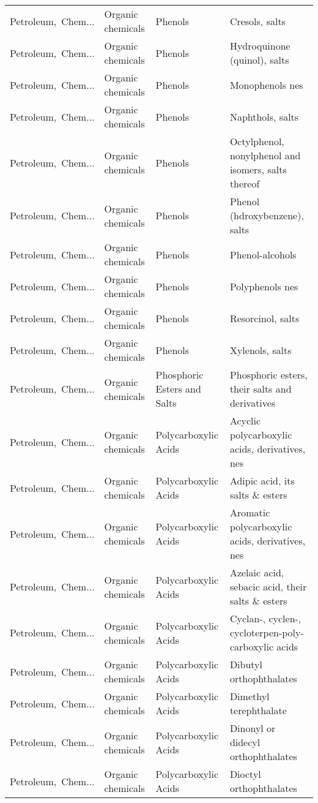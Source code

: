 \begin{appendices}
\begin{xltabular}{\textwidth}{|p{0.10\textwidth}|p{0.25\textwidth}|p{0.24\textwidth}|p{0.31\textwidth}|}
Petroleum,\ Chem... & Organic chemicals & Phenols & Cresols, salts \\
Petroleum,\ Chem... & Organic chemicals & Phenols & Hydroquinone (quinol), salts \\
Petroleum,\ Chem... & Organic chemicals & Phenols & Monophenols nes \\
Petroleum,\ Chem... & Organic chemicals & Phenols & Naphthols, salts \\
Petroleum,\ Chem... & Organic chemicals & Phenols & Octylphenol, nonylphenol and isomers, salts thereof \\
Petroleum,\ Chem... & Organic chemicals & Phenols & Phenol (hdroxybenzene), salts \\
Petroleum,\ Chem... & Organic chemicals & Phenols & Phenol-alcohols \\
Petroleum,\ Chem... & Organic chemicals & Phenols & Polyphenols nes \\
Petroleum,\ Chem... & Organic chemicals & Phenols & Resorcinol, salts \\
Petroleum,\ Chem... & Organic chemicals & Phenols & Xylenols, salts \\
Petroleum,\ Chem... & Organic chemicals & Phosphoric Esters and Salts & Phosphoric esters, their salts and derivatives \\
Petroleum,\ Chem... & Organic chemicals & Polycarboxylic Acids & Acyclic polycarboxylic acids, derivatives, nes \\
Petroleum,\ Chem... & Organic chemicals & Polycarboxylic Acids & Adipic acid, its salts \& esters \\
Petroleum,\ Chem... & Organic chemicals & Polycarboxylic Acids & Aromatic polycarboxylic acids, derivatives, nes \\
Petroleum,\ Chem... & Organic chemicals & Polycarboxylic Acids & Azelaic acid, sebacic acid, their salts \& esters \\
Petroleum,\ Chem... & Organic chemicals & Polycarboxylic Acids & Cyclan-, cyclen-, cycloterpen-poly-carboxylic acids \\
Petroleum,\ Chem... & Organic chemicals & Polycarboxylic Acids & Dibutyl orthophthalates \\
Petroleum,\ Chem... & Organic chemicals & Polycarboxylic Acids & Dimethyl terephthalate \\
Petroleum,\ Chem... & Organic chemicals & Polycarboxylic Acids & Dinonyl or didecyl orthophthalates \\
Petroleum,\ Chem... & Organic chemicals & Polycarboxylic Acids & Dioctyl orthophthalates \\

\end{xltabular}
\end{appendices}
